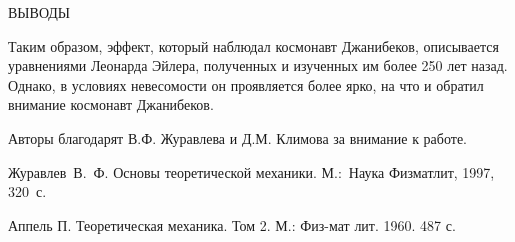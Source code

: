 \documentclass[14pt,a4paper]{extarticle}
\begin{document}
\newpage


{ВЫВОДЫ} 


\smallskip
Таким образом, эффект, который наблюдал космонавт Джанибеков, описывается уравнениями Леонарда Эйлера, полученных и изученных им более 250 лет назад. Однако, в условиях невесомости он проявляется более ярко, на что и обратил внимание космонавт Джанибеков. 


\smallskip

Авторы благодарят В.Ф. Журавлева и Д.М. Климова за внимание к работе.

\begin{thebibliography}{99}
 Журавлев~В.~Ф. Основы теоретической механики.
М.:~Наука Физматлит, 1997, 320~с.

 Аппель П. Теоретическая механика. Том 2. М.: Физ-мат лит. 1960. 487 с.
\end{thebibliography}
\end{document}
